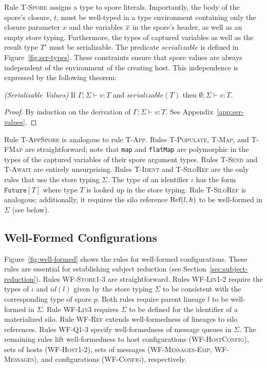 Rule \textsc{T-Spore} assigns a type to spore literals. Importantly,
the body of the spore's closure, $t$, must be well-typed in a type
environment containing only the closure parameter $x$ and the
variables $\overline{x}$ in the spore's header, as well as an empty store
typing. Furthermore, the types of captured variables as well as the
result type $T'$ must be serializable. The predicate $serializable$ is
defined in Figure~\ref{fig:ser-types}. These constraints ensure that
spore values are always independent of the environment of the creating
host. This independence is expressed by the following theorem:

\begin{thm}
\emph{(Serializable Values)}\label{lem:ser-values}
If $\Gamma ; \Sigma \vdash v : T$ and $serializable(T)$ then
$\emptyset ; \Sigma \vdash v : T$.
\end{thm}
\begin{proof}
By induction on the derivation of $\Gamma ; \Sigma \vdash v : T$. See
Appendix~\ref{app:ser-values}.
\end{proof}

Rule \textsc{T-AppSpore} is analogous to rule \textsc{T-App}. Rules
\textsc{T-Populate}, \textsc{T-Map}, and \textsc{T-FMap} are
straightforward; note that \verb|map| and \verb|flatMap| are
polymorphic in the types of the captured variables of their spore
argument types. Rules \textsc{T-Send} and \textsc{T-Await} are
entirely unsurprising. Rules \textsc{T-Ident} and \textsc{T-SiloRef}
are the only rules that use the store typing $\Sigma$. The type of an
identifier $\iota$ has the form $\texttt{Future}[T]$ where type $T$ is
looked up in the store typing. Rule \textsc{T-SiloRef} is analogous;
additionally, it requires the silo reference ${\textrm{Ref}(l, h)}$ to be
well-formed in $\Sigma$ (see below).

\subsection{Well-Formed Configurations}

Figure~\ref{fig:well-formed} shows the rules for well-formed
configurations. These rules are essential for establishing subject
reduction (see Section~\ref{sec:subject-reduction}). Rules
\textsc{WF-Store1-3} are straightforward. Rules \textsc{WF-Lin1-2}
require the types of $\iota$ and $id(l)$ given by the store typing
$\Sigma$ to be consistent with the corresponding type of spore
$p$. Both rules require parent lineage $l$ to be well-formed in
$\Sigma$. Rule \textsc{WF-Lin3} requires $\Sigma$ to be defined for
the identifier of a materialized silo. Rule \textsc{WF-Ref} extends
well-formedness of lineages to silo references. Rules \textsc{WF-Q1-3}
specify well-formedness of message queues in $\Sigma$. The remaining
rules lift well-formedness to host configurations
(\textsc{WF-HostConfig}), sets of hosts (\textsc{WF-Host1-2}), sets of
messages (\textsc{WF-Messages-Emp}, \textsc{WF-Messages}), and
configurations (\textsc{WF-Config}), respectively.

